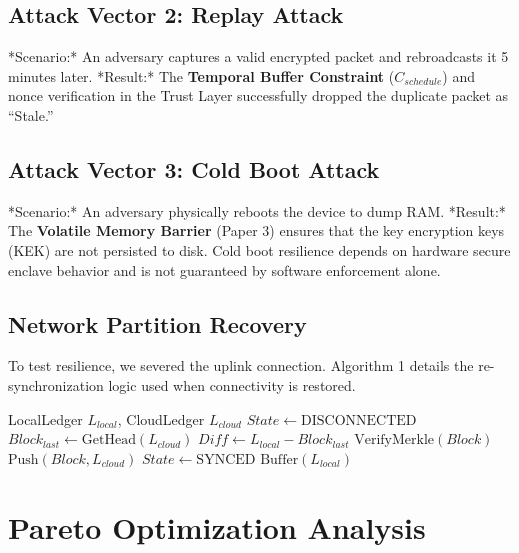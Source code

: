\documentclass[conference]{IEEEtran}
\begin{document}
\subsection{Attack Vector 2: Replay Attack}
*Scenario:* An adversary captures a valid encrypted packet and rebroadcasts it 5 minutes later.
*Result:* The \textbf{Temporal Buffer Constraint} ($C_{schedule}$) and nonce verification in the Trust Layer successfully dropped the duplicate packet as ``Stale.''

\subsection{Attack Vector 3: Cold Boot Attack}
*Scenario:* An adversary physically reboots the device to dump RAM.
*Result:* The \textbf{Volatile Memory Barrier} (Paper 3) ensures that the key encryption keys (KEK) are not persisted to disk. Cold boot resilience depends on hardware secure enclave behavior and is not guaranteed by software enforcement alone.

\subsection{Network Partition Recovery}
To test resilience, we severed the uplink connection. Algorithm 1 details the re-synchronization logic used when connectivity is restored.

\begin{algorithm}
\caption{Consensus Re-Synchronization}
\begin{algorithmic}[1]
\REQUIRE LocalLedger $L_{local}$, CloudLedger $L_{cloud}$
\STATE $State \gets \text{DISCONNECTED}$
        \STATE $Block_{last} \gets \text{GetHead}(L_{cloud})$
        \STATE $Diff \gets L_{local} - Block_{last}$
            \STATE $\text{VerifyMerkle}(Block)$
            \STATE $\text{Push}(Block, L_{cloud})$
        \ENDFOR
        \STATE $State \gets \text{SYNCED}$
        \RETURN 
    \ELSE
        \STATE $\text{Buffer}(L_{local})$ 
    \ENDIF
\ENDWHILE
\end{algorithmic}
\label{alg:sync}
\end{algorithm}

\section{Pareto Optimization Analysis}
\end{document}
